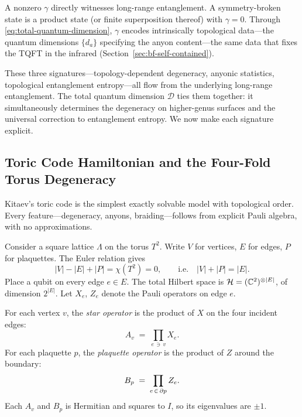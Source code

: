 A nonzero $\gamma$ directly witnesses long-range entanglement.  A symmetry-broken state is a product state (or finite superposition thereof) with $\gamma = 0$.  Through \eqref{eq:total-quantum-dimension}, $\gamma$ encodes intrinsically topological data---the quantum dimensions $\{d_a\}$ specifying the anyon content---the same data that fixes the TQFT in the infrared (Section~\ref{sec:bf-self-contained}).

These three signatures---topology-dependent degeneracy, anyonic statistics, topological entanglement entropy---all flow from the underlying long-range entanglement.  The total quantum dimension $\mathcal{D}$ ties them together: it simultaneously determines the degeneracy on higher-genus surfaces and the universal correction to entanglement entropy.  We now make each signature explicit.

\subsection{Toric Code Hamiltonian and the Four-Fold Torus Degeneracy}
\label{subsec:toric-code-gsd}

Kitaev's toric code \cite{Kitaev2003FaultTolerant} is the simplest exactly solvable model with topological order.  Every feature---degeneracy, anyons, braiding---follows from explicit Pauli algebra, with no approximations.

Consider a square lattice $\Lambda$ on the torus $T^2$.  Write $V$ for vertices, $E$ for edges, $P$ for plaquettes.  The Euler relation gives
\begin{equation}\label{eq:euler-torus}
    |V| - |E| + |P| = \chi(T^2) = 0, \qquad \text{i.e.} \quad |V| + |P| = |E|.
\end{equation}
Place a qubit on every edge $e \in E$.  The total Hilbert space is $\mathcal{H} = (\mathbb{C}^2)^{\otimes |E|}$, of dimension $2^{|E|}$.  Let $X_e$, $Z_e$ denote the Pauli operators on edge $e$.

For each vertex $v$, the \emph{star operator} is the product of $X$ on the four incident edges:
\begin{equation}\label{eq:star-op}
    A_v \;=\; \prod_{e \,\ni\, v} X_e.
\end{equation}
For each plaquette $p$, the \emph{plaquette operator} is the product of $Z$ around the boundary:
\begin{equation}\label{eq:plaquette-op}
    B_p \;=\; \prod_{e \,\in\, \partial p} Z_e.
\end{equation}
Each $A_v$ and $B_p$ is Hermitian and squares to $I$, so its eigenvalues are $\pm 1$.

